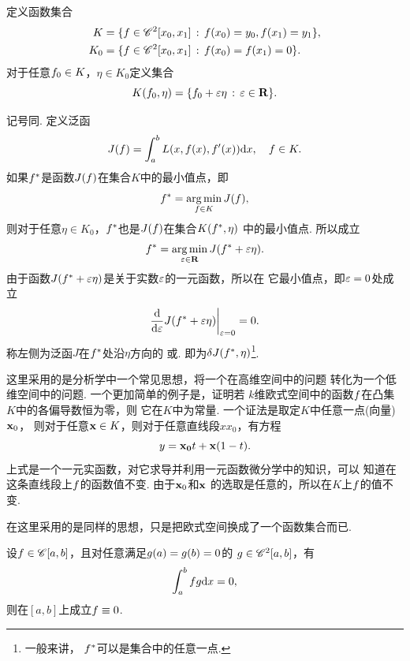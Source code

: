   \begin{defi}
    \label{defi: K}
    定义函数集合
    \[\begin{split}
      K &= \{\mathnormal{f}\in\mathscr{C}^2[x_0, x_1]\,:\,\mathnormal{f}(x_0)=y_0,
      \mathnormal{f}(x_1) = y_1\}, \\
      K_0 &=\{\mathnormal{f}\in\mathscr{C}^2[x_0, x_1]\,:\,\mathnormal{f}(x_0)=
      \mathnormal{f}(x_1) = 0\}.
    \end{split}\]
    对于任意$\mathnormal{f}_0\in K$，$\eta \in K_0$定义集合
    \[
      K(\mathnormal{f}_0, \eta) = \{\mathnormal{f}_0 + \varepsilon\eta\,:\,\varepsilon\in\mathbf{R}\}.
    \]
  \end{defi}

  \begin{defi}[泛函的方向导数]
    \label{def: 泛函的方向导数}
    记号同. 定义泛函
    \[
      J(\mathnormal{f}) = \int_a^bL(x, \mathnormal{f}(x), \mathnormal{f}^\prime(x)) \mathrm{d} x,\quad
      \mathnormal{f} \in K.
    \]
    如果$\mathnormal{f}^*$是函数$J(\mathnormal{f})$在集合$K$中的最小值点，即
    \[
      \mathnormal{f}^* = \operatorname*{arg\,min}_{\mathnormal{f}\in K}J(\mathnormal{f}),
    \]
    则对于任意$\eta\in K_0$，$\mathnormal{f}^*$也是$J(\mathnormal{f})$在集合$K(\mathnormal{f}^*,\eta)$
    中的最小值点. 所以成立
    \[
      \mathnormal{f}^* = \operatorname*{arg\,min}_{\varepsilon\in\mathbf{R}}J(\mathnormal{f}^* + \varepsilon\eta).
    \]
    由于函数$J(\mathnormal{f}^* + \varepsilon\eta)$是关于实数$\varepsilon$的一元函数，所以在
    它最小值点，即$\varepsilon =0$处成立
    \begin{equation}
      \label{equ: 方向导数为零}
      \frac{\mathrm{d}}{\mathrm{d}\varepsilon}J(\mathnormal{f}^* + \varepsilon\eta)\bigg|_{\varepsilon =0}=0.
    \end{equation}
    称左侧为泛函$J$在$\mathnormal{f}^*$处沿$\eta$方向的
    或. 即为$\delta J(\mathnormal{f}^*, \eta)$\footnote{一般来讲，
    $\mathnormal{f}^*$可以是集合中的任意一点. }.
  \end{defi}
  \remark
    这里采用的是分析学中一个常见思想，将一个在高维空间中的问题
    转化为一个低维空间中的问题. 一个更加简单的例子是，证明若
    $k$维欧式空间中的函数$\mathnormal{f}$在凸集$K$中的各偏导数恒为零，则
    它在$K$中为常量. 一个证法是取定$K$中任意一点(向量)$\mathbf{x}_0$，
    则对于任意$\mathbf{x}\in K$，则对于任意直线段$xx_0$，有方程
    \[
      y = \mathbf{x_0}t + \mathbf{x}(1-t).
    \]
    上式是一个一元实函数，对它求导并利用一元函数微分学中的知识，可以
    知道在这条直线段上$\mathnormal{f}$的函数值不变. 由于$\mathbf{x}_0$和$\mathbf{x}$
    的选取是任意的，所以在$K$上$\mathnormal{f}$的值不变. \par
    在这里采用的是同样的思想，只是把欧式空间换成了一个函数集合而已.

  \begin{lemma}[变分引理 I]
    \label{lemma: 变分引理}
    设$\mathnormal{f}\in\mathscr{C}[a,b]$，且对任意满足$\mathnormal{g}(a)=\mathnormal{g}(b)=0$的
    $\mathnormal{g}\in\mathscr{C}^2[a,b]$，有
    \[
      \int_{a}^{b}\mathnormal{f}\mathnormal{g} \mathrm{d} x =0,
    \]
    则在$[a,b]$上成立$\mathnormal{f}\equiv 0$.
  \end{lemma}

